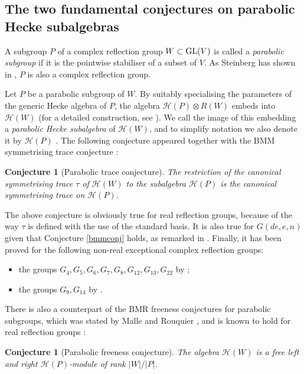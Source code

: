 \documentclass[11pt, reqno]{amsart}
\newcommand{\cH}{\mathcal{H}}
\numberwithin{equation}{section}
\newtheorem{conjecture}[theorem]{Conjecture}
\theoremstyle{remark}
\begin{document}
	
		
	
	\subsection{The two fundamental conjectures on parabolic Hecke subalgebras}	\label{sec-2.3}
	A subgroup $P$ of a complex reflection group $W \subset {\rm GL}(V)$ is called a \emph{parabolic subgroup} if it is the pointwise stabiliser of a subset of $V$. As Steinberg has shown in \cite[Theorem 1.5]{St64}, $P$ is also a complex reflection group.
	
	Let $P$ be a parabolic subgroup of $W$.
	By suitably specialising the parameters of the generic Hecke algebra of $P$, the algebra $\cH(P) \otimes R(W)$ embeds into $\cH(W)$ (for a detailed construction, see \cite[\S 2.5]{ChCh}). We call the image of this embedding a \emph{parabolic Hecke subalgebra} of  $\cH(W)$, and to simplify notation we also denote it by $\cH(P)$ . The following conjecture appeared together with the BMM symmetrising trace conjecture   \cite[\S 2.1, Assumption 2(2)(c)]{BMM}:
	
	\begin{conjecture}[Parabolic trace conjecture]\label{parconj}
		The restriction of the canonical symmetrising trace $\tau$ of $\cH(W)$ to the subalgebra $\cH(P)$ is the canonical symmetrising trace on $\cH(P)$.
	\end{conjecture}
	
	
	The above conjecture is obviously true for real reflection groups, because of the way $\tau$ is defined with the use of the standard basis. It is also true for $G(de,e,n)$ given that Conjecture \ref{bmmconj} holds, as  remarked in \cite[\S 5.4]{Ch26}. Finally, it has been proved for the following non-real exceptional complex reflection groups:
	\begin{itemize}
		\item the groups $G_4, G_5, G_6, G_7,  G_8, G_{12}, G_{13},G_{22}$ by  \cite{ChCh}; \smallbreak
		\item the groups $G_9, G_{14}$ by \cite{Ch26}.
	\end{itemize}
	
	There is also a counterpart of the BMR freeness conjectures for parabolic subgroups, which was stated by Malle and Rouquier  \cite[Conjecture 2.1]{malrou}, and  is known to hold for real reflection groups \cite[\S 4.4.7, Relation (b)]{gepf}:
	
	\begin{conjecture}[Parabolic freeness conjecture]\label{pfc} The algebra $\mathcal{H}(W)$ is a free left and right $\mathcal{H}(P)$-module of rank $|W|/|P|$.
	\end{conjecture}
	
\end{document}

